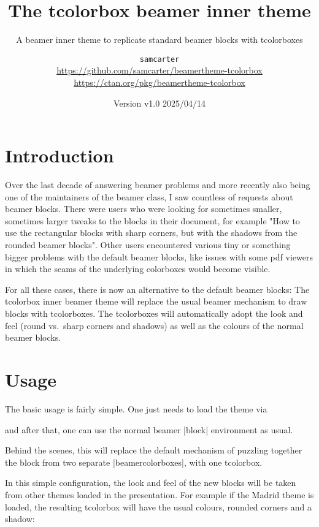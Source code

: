 \documentclass{scrartcl}
\title{The tcolorbox beamer inner theme}
\subtitle{A beamer inner theme to replicate standard beamer blocks with tcolorboxes}
\author{%
  \texorpdfstring{
    \texttt{samcarter}\\
    \url{https://github.com/samcarter/beamertheme-tcolorbox}\\
    \url{https://ctan.org/pkg/beamertheme-tcolorbox}
  }{samcarter}}
\date{Version v1.0 \textendash{} 2025/04/14}
\begin{document}
\maketitle

\section{Introduction}
\label{intro}

Over the last decade of answering beamer problems and more recently also being one of the maintainers of the beamer class, I saw countless of requests about beamer blocks. There were users who were looking for sometimes smaller, sometimes larger tweaks to the blocks in their document, for example "How to use the rectangular blocks with sharp corners, but with the shadows from the rounded beamer blocks". Other users encountered various tiny or something bigger problems with the default beamer blocks, like issues with some pdf viewers in which the seams of the underlying colorboxes would become visible.

For all these cases, there is now an alternative to the default beamer blocks: The tcolorbox inner beamer theme will replace the usual beamer mechanism to draw blocks with tcolorboxes. The tcolorboxes will automatically adopt the look and feel (round vs.\ sharp corners and shadows) as well as the colours of the normal beamer blocks.

\blurb

\section{Usage}

The basic usage is fairly simple. One just needs to load the theme via
\begin{tcolorbox}[lower separated=false,title={Usage}]
\begin{samcode}
\end{samcode}
\end{tcolorbox}
and after that, one can use the normal beamer \saminline|block| environment as usual.

Behind the scenes, this will replace the default mechanism of puzzling together the block from two separate \saminline|beamercolorboxes|, with one tcolorbox.

In this simple configuration, the look and feel of the new blocks will be taken from other themes loaded in the presentation. For example if the Madrid theme is loaded, the resulting tcolorbox will have the usual colours, rounded corners and a shadow:
\end{document}
